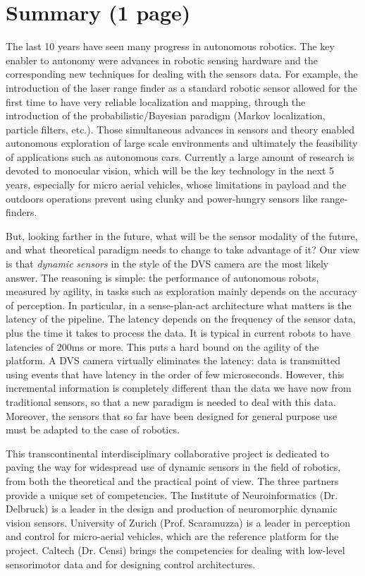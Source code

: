 
\section{Summary (1 page)}



The last 10 years have seen many progress in autonomous robotics. The key enabler
to autonomy were advances in robotic sensing hardware and the corresponding
new techniques for dealing with the sensors data. For example, the introduction
of the laser range finder as a standard robotic sensor allowed for the first
time to have very reliable localization and mapping, through the introduction
of the probabilistic/Bayesian paradigm (Markov localization, particle filters,
etc.). Those simultaneous advances in sensors and theory enabled autonomous
exploration of large scale environments and ultimately the feasibility of applications
such as autonomous cars. Currently a large amount of research is devoted to
monocular vision, which will be the key technology in the next 5 years, especially
for micro aerial vehicles, whose limitations in payload and the outdoors operations
prevent using clunky and power-hungry sensors like range-finders. 

But, looking farther in the future, what will be the sensor modality of the
future, and what theoretical paradigm needs to change to take advantage of it?
Our view is that \emph{dynamic} \emph{sensors} in the style of the DVS camera
are the most likely answer. The reasoning is simple: the performance of autonomous
robots, measured by agility, in tasks such as exploration mainly depends on
the accuracy of perception. In particular, in a sense-plan-act architecture
what matters is the latency of the pipeline. The latency depends on the frequency
of the sensor data, plus the time it takes to process the data. It is typical
in current robots to have latencies of 200ms or more. This puts a hard bound
on the agility of the platform. A DVS camera virtually eliminates the latency:
data is transmitted using events that have latency in the order of few microseconds.
However, this incremental information is completely different than the data
we have now from traditional sensors, so that a new paradigm is needed to deal
with this data. Moreover, the sensors that so far have been designed for general
purpose use must be adapted to the case of robotics.

This transcontinental interdisciplinary collaborative project is dedicated to
paving the way for widespread use of dynamic sensors in the field of robotics,
from both the theoretical and the practical point of view. The three partners
provide a unique set of competencies. The Institute of Neuroinformatics (Dr.
Delbruck) is a leader in the design and production of neuromorphic dynamic vision
sensors. University of Zurich (Prof. Scaramuzza) is a leader in perception and
control for micro-aerial vehicles, which are the reference platform for the
project. Caltech (Dr. Censi) brings the competencies for dealing with low-level
sensorimotor data and for designing control architectures.

